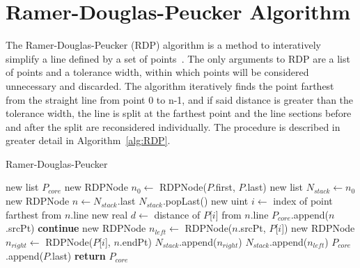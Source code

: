 \section{Ramer-Douglas-Peucker Algorithm}
The Ramer-Douglas-Peucker (RDP) algorithm is a method to interatively simplify a line defined by a set of points~\cite{RDP_line_reduction_DP, RDP_line_reduction_R}.
The only arguments to RDP are a list of points and a tolerance width, within which points will be considered unnecessary and discarded.
The algorithm iteratively finds the point farthest from the straight line from point 0 to n-1, and if said distance is greater than the tolerance width, the line is split at the farthest point and the line sections before and after the split are reconsidered individually.
The procedure is described in greater detail in Algorithm~\ref{alg:RDP}.

\begin{algorithm}[htb]
\caption{Ramer-Douglas-Peucker}\label{alg:RDP}
\begin{algorithmic}[1]
	\State new list $P_{core}$
	\State new RDPNode $n_0 \leftarrow$ RDPNode($P$.first, $P$.last)
	\State new list $N_{stack} \leftarrow n_0$
		\State new RDPNode $n \leftarrow N_{stack}$.last
		\State $N_{stack}$.popLast()
		\State new uint $i \leftarrow$ index of point farthest from $n$.line
		\State new real $d \leftarrow$ distance of $P$[$i$] from $n$.line
		 
			\State $P_{core}$.append($n$.srcPt) 
			\State \textbf{continue}
		\EndIf
		\State new RDPNode $n_{left} \leftarrow$ RDPNode($n$.srcPt, $P$[$i$])
		\State new RDPNode $n_{right} \leftarrow$ RDPNode($P$[$i$], $n$.endPt)
		\State $N_{stack}$.append($n_{right}$)
		\State $N_{stack}$.append($n_{left}$)
	\EndWhile
	\State $P_{core}$.append($P$.last)
	\State \textbf{return} $P_{core}$
\EndFunction
\end{algorithmic}
\end{algorithm}

